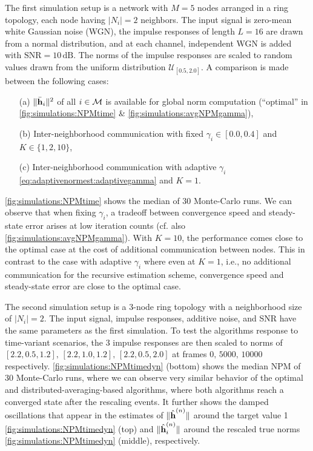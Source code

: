 \documentclass{article}
\begin{document}
The first simulation setup is a network with \(M=5\) nodes arranged in a ring topology, each node having \(|N_i|=2\) neighbors.
The input signal is zero-mean white Gaussian noise (WGN), the impulse responses of length \(L=16\) are drawn from a normal distribution, and at each channel, independent WGN is added with \(\text{SNR}=10\,\text{dB}\).
The norms of the impulse responses are scaled to random values drawn from the uniform distribution \(\mathcal{U}_{[0.5,2.0]}\).
A comparison is made between the following cases:
\begin{itemize}
    \itemsep-0.2em
    \item[(a)] \(\|\bar{\bm{\mathrm{h}}}_i\|^2\) of all \(i \in \mathcal{M}\) is available for global norm computation (``optimal'' in \autoref{fig:simulations:NPMtime} \& \autoref{fig:simulations:avgNPMgamma}),
    \item[(b)] Inter-neighborhood communication with fixed \(\gamma_i \in [0.0, 0.4]\) and \(K \in \{1,2,10\}\),
    \item[(c)] Inter-neighborhood communication with adaptive \(\gamma_i\) \eqref{eq:adaptivenormest:adaptivegamma} and \(K=1\).
\end{itemize}
\autoref{fig:simulations:NPMtime} shows the median of 30 Monte-Carlo runs.
We can observe that when fixing \(\gamma_i\), a tradeoff between convergence speed and steady-state error arises at low iteration counts (cf. also \autoref{fig:simulations:avgNPMgamma}).
With \(K=10\), the performance comes close to the optimal case at the cost of additional communication between nodes.
This in contrast to the case with adaptive \(\gamma_i\) where even at \(K=1\), i.e., no additional communication for the recursive estimation scheme, convergence speed and steady-state error are close to the optimal case.

The second simulation setup is a \(3\)-node ring topology with a neighborhood size of \(|N_i|=2\).
The input signal, impulse responses, additive noise, and SNR have the same parameters as the first simulation.
To test the algorithms response to time-variant scenarios, the 3 impulse responses are then scaled to norms of \([2.2, 0.5, 1.2],\, [2.2, 1.0, 1.2],\, [2.2, 0.5, 2.0]\) at frames \(0,\, 5000,\, 10000\) respectively.
\autoref{fig:simulations:NPMtimedyn} (bottom) shows the median NPM of 30 Monte-Carlo runs, where we can observe very similar behavior of the optimal and distributed-averaging-based algorithms, where both algorithms reach a converged state after the rescaling events.
It further shows the damped oscillations that appear in the estimates of \(\|\hat{\bm{\mathrm{h}}}^{(n)}\|\) around the target value 1 \autoref{fig:simulations:NPMtimedyn} (top) and \(\|\hat{\bm{\mathrm{h}}}_i^{(n)}\|\) around the rescaled true norms \autoref{fig:simulations:NPMtimedyn} (middle), respectively.
\end{document}
